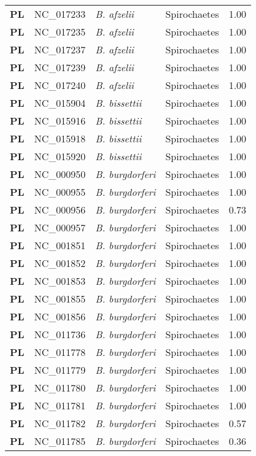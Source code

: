 \begin{adjustwidth}{-3cm}{2cm}
{\begin{supertabular}{>{\bfseries}l|p{0.1\textwidth}p{0.14\textwidth}l|l}
PL & NC\_017233 & \textit{B. afzelii} &  Spirochaetes & 1.00\\
PL & NC\_017235 & \textit{B. afzelii} &  Spirochaetes & 1.00\\
PL & NC\_017237 & \textit{B. afzelii} &  Spirochaetes & 1.00\\
PL & NC\_017239 & \textit{B. afzelii} &  Spirochaetes & 1.00\\
PL & NC\_017240 & \textit{B. afzelii} &  Spirochaetes & 1.00\\
PL & NC\_015904 & \textit{B. bissettii} &  Spirochaetes & 1.00\\
PL & NC\_015916 & \textit{B. bissettii} &  Spirochaetes & 1.00\\
PL & NC\_015918 & \textit{B. bissettii} &  Spirochaetes & 1.00\\
PL & NC\_015920 & \textit{B. bissettii} &  Spirochaetes & 1.00\\
PL & NC\_000950 & \textit{B. burgdorferi} &  Spirochaetes & 1.00\\
PL & NC\_000955 & \textit{B. burgdorferi} &  Spirochaetes & 1.00\\
PL & NC\_000956 & \textit{B. burgdorferi} &  Spirochaetes & 0.73\\
PL & NC\_000957 & \textit{B. burgdorferi} &  Spirochaetes & 1.00\\
PL & NC\_001851 & \textit{B. burgdorferi} &  Spirochaetes & 1.00\\
PL & NC\_001852 & \textit{B. burgdorferi} &  Spirochaetes & 1.00\\
PL & NC\_001853 & \textit{B. burgdorferi} &  Spirochaetes & 1.00\\
PL & NC\_001855 & \textit{B. burgdorferi} &  Spirochaetes & 1.00\\
PL & NC\_001856 & \textit{B. burgdorferi} &  Spirochaetes & 1.00\\
PL & NC\_011736 & \textit{B. burgdorferi} &  Spirochaetes & 1.00\\
PL & NC\_011778 & \textit{B. burgdorferi} &  Spirochaetes & 1.00\\
PL & NC\_011779 & \textit{B. burgdorferi} &  Spirochaetes & 1.00\\
PL & NC\_011780 & \textit{B. burgdorferi} &  Spirochaetes & 1.00\\
PL & NC\_011781 & \textit{B. burgdorferi} &  Spirochaetes & 1.00\\
PL & NC\_011782 & \textit{B. burgdorferi} &  Spirochaetes & 0.57\\
PL & NC\_011785 & \textit{B. burgdorferi} &  Spirochaetes & 0.36\\

\end{supertabular}}
\end{adjustwidth}
